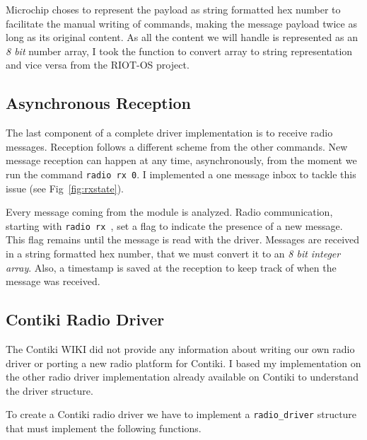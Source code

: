 

Microchip choses to represent the payload as string formatted hex number to
facilitate the manual writing of commands, making the message payload twice as
long as its original content. 
As all the content we will handle is represented as an \emph{8 bit} number array, 
I took the function to convert array to string representation and vice versa
from the RIOT-OS project.

\subsection{Asynchronous Reception}

The last component of a complete driver implementation is to receive radio
messages.
Reception follows a different scheme from the other commands. 
New message reception can happen at any time, asynchronously, from the moment
we run the command \lstinline{radio rx 0}.
I implemented a one message inbox to tackle this issue (see Fig~\ref{fig:rxstate}).

Every message coming from the module is analyzed.
Radio communication, starting with \lstinline{radio rx }, set a flag to indicate the 
presence of a new message. 
This flag remains until the message is read with the driver.
Messages are received in a string formatted hex number, that we must convert it to an
\emph{8 bit integer array}. 
Also, a timestamp is saved at the reception to keep track of when the
message was received.



\subsection{Contiki Radio Driver}

The Contiki WIKI did not provide any information about writing our own radio driver
or porting a new radio platform for Contiki.
I based my implementation on the other radio driver implementation already
available on Contiki to understand the driver structure.

To create a Contiki radio driver we have to implement a \lstinline{radio_driver}
structure that must implement the following functions.


